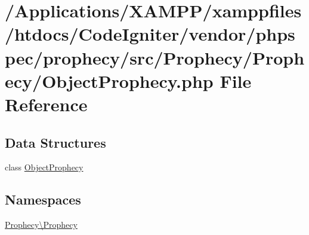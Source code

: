\hypertarget{_object_prophecy_8php}{}\section{/\+Applications/\+X\+A\+M\+P\+P/xamppfiles/htdocs/\+Code\+Igniter/vendor/phpspec/prophecy/src/\+Prophecy/\+Prophecy/\+Object\+Prophecy.php File Reference}
\label{_object_prophecy_8php}
\subsection*{Data Structures}
\begin{DoxyCompactItemize}
\item 
class \mbox{\hyperlink{class_prophecy_1_1_prophecy_1_1_object_prophecy}{Object\+Prophecy}}
\end{DoxyCompactItemize}
\subsection*{Namespaces}
\begin{DoxyCompactItemize}
\item 
 \mbox{\hyperlink{namespace_prophecy_1_1_prophecy}{Prophecy\textbackslash{}\+Prophecy}}
\end{DoxyCompactItemize}
